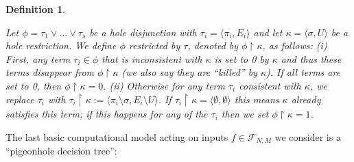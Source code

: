 \documentclass[11pt]{article}
\newtheorem{definition}{Definition}
\begin{document}
\begin{definition}
    \label{def-restricting-a-dnf}
    
Let $\phi = \tau_1 \lor \ldots \lor \tau_s$ be a hole disjunction with $\tau_i = \langle \pi_i, E_i\rangle$ and let $\kappa = \langle \sigma,U\rangle$ be a hole restriction.
We define $\phi$ restricted by $\tau$, denoted by $\phi \upharpoonright\kappa$, as follows:
(i) First, any term $\tau_i \in \phi$ that is inconsistent with $\kappa$ is set to 0 by $\kappa$ and thus these terms disappear from $\phi \upharpoonright \kappa$ (we also say they are ``killed'' by $\kappa$). If all terms are set to 0, then $\phi\upharpoonright\kappa  =0$. 
(ii) Otherwise for any term $\tau_i$ consistent with $\kappa$, we replace $\tau_i$ with $\tau_i \upharpoonright \kappa := \langle \pi_i \setminus \sigma, E_i \setminus U\rangle$. If $\tau_i \upharpoonright \kappa = \langle \emptyset, \emptyset \rangle$ this means $\kappa$ already satisfies this term; if this happens for any of the $\tau_i$ then we set $\phi \upharpoonright \kappa=1$. 
\end{definition}

The last basic computational model acting on inputs $f\in \mathcal{F}_{N,M}$ we consider is a ``pigeonhole decision tree'':
\end{document}
